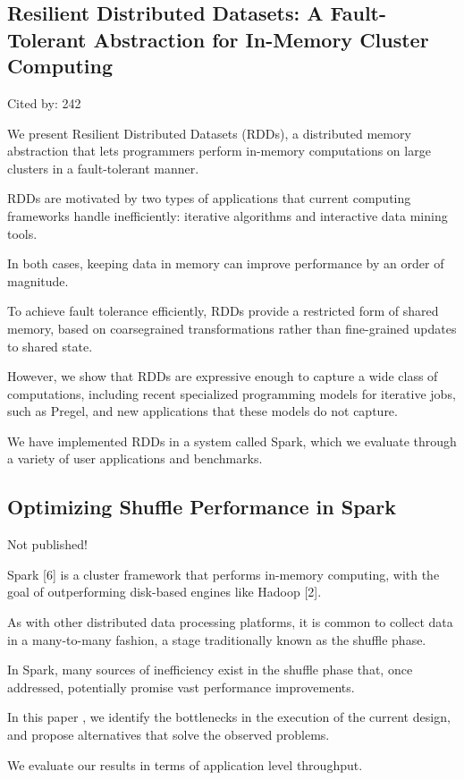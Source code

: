 \documentclass[a4paper,11pt]{article}
\begin{document}
\subsection*{Resilient Distributed Datasets: A Fault-Tolerant Abstraction for In-Memory Cluster Computing}
{\color{cyan} {\color{magenta} Cited by: 242}

We present 
{\color{black} Resilient Distributed Datasets (RDDs)\cite{rdd}}, 
a distributed memory abstraction that 
lets programmers perform in-memory computations on large clusters 
in a fault-tolerant manner. 

RDDs are motivated by two types of applications that 
current computing frameworks handle inefficiently: 
iterative algorithms and interactive data mining tools. 

In both cases, 
keeping data in memory 
can improve performance by an order of magnitude.

To achieve fault tolerance efficiently, 
RDDs provide a restricted form of shared memory, 
based on coarsegrained transformations rather than fine-grained updates to shared state. 

However, 
we show that 
RDDs are expressive enough to capture a wide class of computations, including
recent specialized programming models for iterative jobs, such as Pregel, and 
new applications that these models do not capture.

We have implemented RDDs in a system called Spark, 
which we evaluate through a variety of user applications and benchmarks.

}

\subsection*{Optimizing Shuffle Performance in Spark}
{\color{cyan} {\color{magenta} Not published!}

Spark [6] is a cluster framework that performs in-memory computing, 
with the goal of outperforming disk-based engines like Hadoop [2]. 

As with other distributed data processing platforms, 
it is common to collect data in a many-to-many fashion, 
a stage traditionally known as the shuffle phase. 

In Spark, many sources of inefficiency exist in the shuffle phase that, 
once addressed, potentially promise vast performance improvements. 

In this paper {\color{black} \cite{sparkshuffle}}, 
we identify the bottlenecks in the execution of the current design, and 
propose alternatives that solve the observed problems. 

We evaluate our results in terms of 
application level throughput.

}
\end{document}
